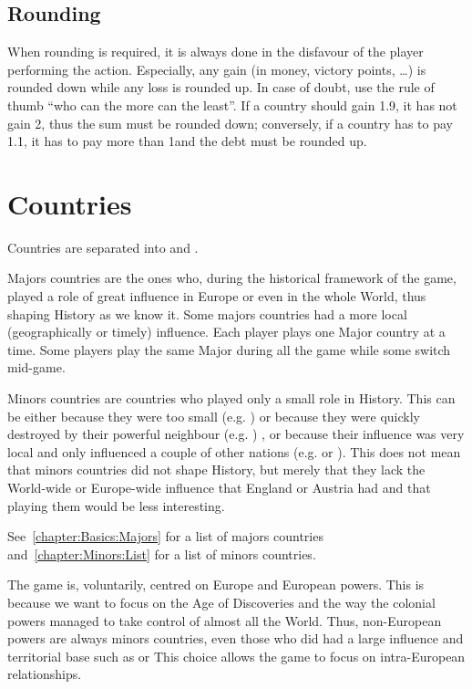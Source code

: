 \subsection{Rounding}

\aparag When rounding is required, it is always done in the disfavour of the
player performing the action.
\bparag Especially, any gain (in money, victory points, \ldots) is rounded
down while any loss is rounded up.
\bparag In case of doubt, use the rule of thumb ``who can the more can the
least''. If a country should gain 1.9\ducats, it has not gain 2\ducats, thus
the sum must be rounded down; conversely, if a country has to pay 1.1\ducats,
it has to pay more than 1\ducats and the debt must be rounded up.




\section{Countries}

 Countries are separated into  and .

\aparag Majors countries are the ones who, during the historical framework of
the game, played a role of great influence in Europe or even in the whole
World, thus shaping History as we know it.
\bparag Some majors countries had a more local (geographically or timely)
influence.
\bparag Each player plays one Major country at a time. Some players play the
same Major during all the game while some switch mid-game.

\aparag Minors countries are countries who played only a small role in
History.
\bparag This can be either because they were too small (e.g. \paysCologne) or
because they were quickly destroyed by their powerful neighbour
(e.g. \paysDamas) , or because their influence was very local and only
influenced a couple of other nations (e.g. \paysPerse or \paysEcosse).
\bparag This does not mean that minors countries did not shape History, but
merely that they lack the World-wide or Europe-wide influence that England or
Austria had and that playing them would be less interesting.

\aparag See~\ref{chapter:Basics:Majors} for a list of majors countries
and~\ref{chapter:Minors:List} for a list of minors countries.

 The game is, voluntarily, centred on Europe and
European powers. This is because we want to focus on the Age of Discoveries
and the way the colonial powers managed to take control of almost all the
World.
\bparag Thus, non-European powers are always minors countries, even those who
did had a large influence and territorial base such as \paysChine or
\paysMogol %
\bparag This choice allows the game to focus on intra-European relationships.




